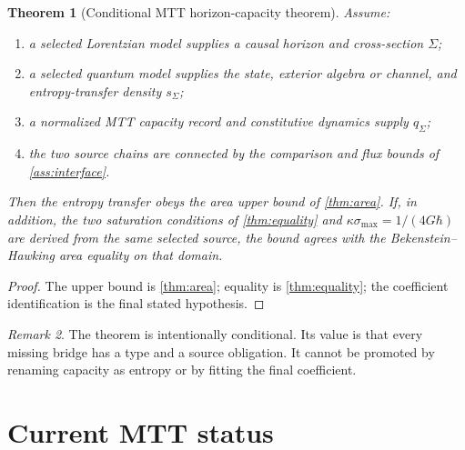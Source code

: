 \documentclass[11pt,a4paper]{article}
\numberwithin{equation}{section}
\newtheorem{theorem}{Theorem}[section]
\theoremstyle{definition}
\theoremstyle{remark}
\newtheorem{remark}[theorem]{Remark}
\begin{document}
\begin{theorem}[Conditional MTT horizon-capacity theorem]
\label{thm:mtt}
Assume:
\begin{enumerate}[leftmargin=2em]
\item a selected Lorentzian model supplies a causal horizon and
  cross-section \(\Sigma\);
\item a selected quantum model supplies the state, exterior algebra or
  channel, and entropy-transfer density \(s_\Sigma\);
\item a normalized MTT capacity record and constitutive dynamics supply
  \(q_\Sigma\);
\item the two source chains are connected by the comparison and flux
  bounds of \cref{ass:interface}.
\end{enumerate}
Then the entropy transfer obeys the area upper bound of
\cref{thm:area}.  If, in addition, the two saturation conditions of
\cref{thm:equality} and
\(\kappa\sigma_{\max}=1/(4G\hbar)\) are derived from the same selected
source, the bound agrees with the Bekenstein--Hawking area equality on
that domain.
\end{theorem}

\begin{proof}
The upper bound is \cref{thm:area}; equality is \cref{thm:equality}; the
coefficient identification is the final stated hypothesis.
\end{proof}

\begin{remark}
The theorem is intentionally conditional.  Its value is that every
missing bridge has a type and a source obligation.  It cannot be promoted
by renaming capacity as entropy or by fitting the final coefficient.
\end{remark}

\section{Current MTT status}
\end{document}
